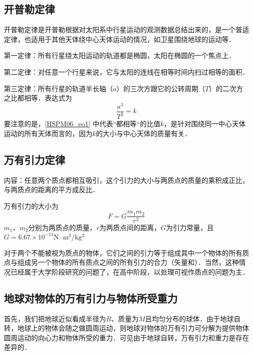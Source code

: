 
\begin{issues}
\issueDraft
\issueTODO
\end{issues}

\subsection{开普勒定律}

开普勒定律是开普勒根据对太阳系中行星运动的观测数据总结出来的，是一个普适定律，也适用于其他天体绕中心天体运动的情况，如卫星围绕地球的运动等．

第一定律：所有行星绕太阳运动的轨道都是椭圆，太阳在椭圆的一个焦点上．

第二定律：对任意一个行星来说，它与太阳的连线在相等时间内扫过相等的面积．

第三定律：所有行星的轨道半长轴（$a$）的三次方跟它的公转周期（$T$）的二次方之比都相等．表达式为
\begin{equation}\label{HSPM06_eq1}
\frac{a^3}{T^2}=k
\end{equation}
要注意的是，\autoref{HSPM06_eq1} 中代表“都相等“的比值$k$，是针对围绕同一中心天体运动的所有天体而言的，因为$k$的大小与中心天体的质量有关．

\subsection{万有引力定律}

内容：任意两个质点都相互吸引，这个引力的大小与两质点的质量的乘积成正比，与两质点的距离的平方成反比．

万有引力的大小为
\begin{equation}
F=G\frac{m_1m_2}{r^2}
\end{equation}
$m_1$、$m_2$分别为两质点的质量，$r$为两质点间的距离，$G$为引力常量，且$G=6.67\times 10^{-11}\mathrm{N\cdot m^2/kg^2}$

对于两个不能被视为质点的物体，它们之间的引力等于组成其中一个物体的所有质点与组成另一个物体的所有质点之间的所有引力的合力（矢量和）．当然，这种情况已经属于大学阶段研究的问题了，在高中阶段，以处理可视作质点的问题为主．

\subsection{地球对物体的万有引力与物体所受重力}

首先，我们把地球近似看成半径为$R$、质量为$M$且均匀分布的球体．由于地球自转，地球上的物体会随之做圆周运动，则地球对物体的万有引力可分解为提供物体圆周运动的向心力和物体所受的重力．可见由于地球自转，万有引力和重力是存在差异的．

